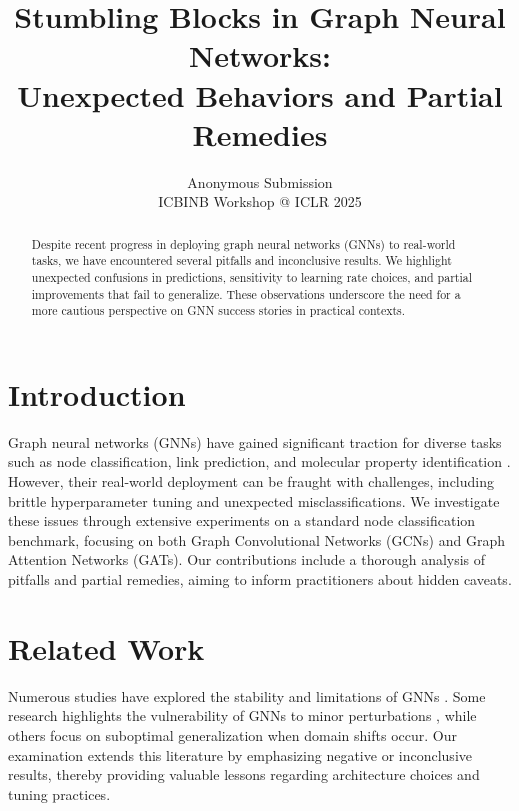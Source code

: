 \documentclass[11pt]{article}
\title{Stumbling Blocks in Graph Neural Networks: \\ Unexpected Behaviors and Partial Remedies}
\author{Anonymous Submission \\ ICBINB Workshop @ ICLR 2025}
\date{}
\begin{document}
\maketitle

\begin{abstract}
Despite recent progress in deploying graph neural networks (GNNs) to real-world tasks, we have encountered several pitfalls and inconclusive results. We highlight unexpected confusions in predictions, sensitivity to learning rate choices, and partial improvements that fail to generalize. These observations underscore the need for a more cautious perspective on GNN success stories in practical contexts.
\end{abstract}

\section{Introduction}
Graph neural networks (GNNs) have gained significant traction for diverse tasks such as node classification, link prediction, and molecular property identification \citep{kipf2017semi,goodfellow2014explaining}. However, their real-world deployment can be fraught with challenges, including brittle hyperparameter tuning and unexpected misclassifications. We investigate these issues through extensive experiments on a standard node classification benchmark, focusing on both Graph Convolutional Networks (GCNs) and Graph Attention Networks (GATs). Our contributions include a thorough analysis of pitfalls and partial remedies, aiming to inform practitioners about hidden caveats.

\section{Related Work}
Numerous studies have explored the stability and limitations of GNNs \citep{velivckovic2017graph,smith2022pitfalls}. Some research highlights the vulnerability of GNNs to minor perturbations \citep{zugner2018adversarial}, while others focus on suboptimal generalization when domain shifts occur. Our examination extends this literature by emphasizing negative or inconclusive results, thereby providing valuable lessons regarding architecture choices and tuning practices.

\end{document}
